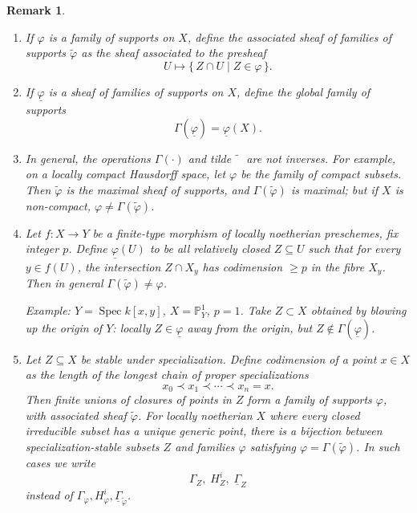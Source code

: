 \documentclass[12pt]{book}
\theoremstyle{plain}
\newtheorem{remark}{Remark}[section]
\begin{document}
\begin{remark}
\begin{enumerate}
\item If \(\varphi\) is a family of supports on \(X\), define the associated sheaf of families of supports \(\tilde{\varphi}\) as the sheaf associated to the presheaf
\[
U\mapsto \{\,Z\cap U \mid Z\in\varphi\,\}.
\]

\item If \(\underline{\varphi}\) is a sheaf of families of supports on \(X\), define the global family of supports
\[
\Gamma(\underline{\varphi}) = \underline{\varphi}(X).
\]

\item In general, the operations \(\Gamma(\cdot)\) and tilde \(\tilde{\phantom{\varphi}}\) are \textit{not} inverses. For example, on a locally compact Hausdorff space, let \(\varphi\) be the family of compact subsets. Then \(\tilde{\varphi}\) is the maximal sheaf of supports, and \(\Gamma(\tilde{\varphi})\) is maximal; but if \(X\) is non-compact, \(\varphi\ne\Gamma(\tilde{\varphi})\).

\item Let \(f\colon X\to Y\) be a finite-type morphism of locally noetherian preschemes, fix integer \(p\). Define \(\underline{\varphi}(U)\) to be all relatively closed \(Z\subseteq U\) such that for every \(y\in f(U)\), the intersection \(Z\cap X_y\) has codimension \(\ge p\) in the fibre \(X_y\). Then in general \(\Gamma(\tilde{\varphi})\ne\varphi\).

Example: \(Y=\operatorname{Spec}k[x,y]\), \(X=\mathbb{P}_Y^1\), \(p=1\). Take \(Z\subset X\) obtained by blowing up the origin of \(Y\): locally \(Z\in\underline{\varphi}\) away from the origin, but \(Z\notin\Gamma(\underline{\varphi})\).

\item Let \(Z\subseteq X\) be stable under specialization. Define codimension of a point \(x\in X\) as the length of the longest chain of proper specializations
\[
x_0\prec x_1\prec\cdots\prec x_n = x.
\]
Then finite unions of closures of points in \(Z\) form a family of supports \(\varphi\), with associated sheaf \(\tilde{\varphi}\). For locally noetherian \(X\) where every closed irreducible subset has a unique generic point, there is a bijection between specialization-stable subsets \(Z\) and families \(\varphi\) satisfying \(\varphi=\Gamma(\tilde{\varphi})\). In such cases we write
\[
\Gamma_Z,\; H_Z^i,\; \underline{\Gamma}_Z
\]
instead of \(\Gamma_\varphi,H_\varphi^i,\underline{\Gamma}_{\tilde{\varphi}}\).
\end{enumerate}
\end{remark}
\end{document}
